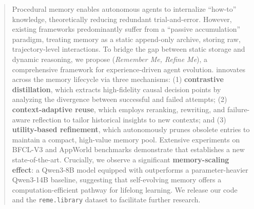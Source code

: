 
\begin{abstract}
Procedural memory enables autonomous agents to internalize ``how-to'' knowledge, theoretically reducing redundant trial-and-error. 
However, existing frameworks predominantly suffer from a ``passive accumulation'' paradigm, treating memory as a static
append-only archive, storing raw, trajectory-level
interactions.
To bridge the gap between static storage and dynamic reasoning, we propose \textbf{\ours} (\textit{Remember Me, Refine Me}), a comprehensive framework for experience-driven agent evolution. 
\textbf{\ours} innovates across the memory lifecycle via three mechanisms: (1) \textbf{contrastive distillation}, which extracts high-fidelity causal decision points by analyzing the divergence between successful and failed attempts; (2) \textbf{context-adaptive reuse}, which employs reranking, rewriting, and failure-aware reflection to tailor historical insights to new contexts; and (3) \textbf{utility-based refinement}, which autonomously prunes obsolete entries to maintain a compact, high-value memory pool. 
Extensive experiments on BFCL-V3 and AppWorld benchmarks demonstrate that \textbf{\ours} establishes a new state-of-the-art. 
Crucially, we observe a significant \textbf{memory-scaling effect}: a Qwen3-8B model equipped with \ours outperforms a parameter-heavier Qwen3-14B baseline, suggesting that self-evolving memory offers a computation-efficient pathway for lifelong learning. 
We release our code and the \texttt{reme.library} dataset to facilitate further research.
\end{abstract}